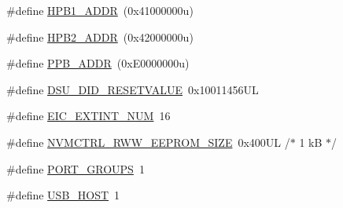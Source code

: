 \begin{DoxyCompactItemize}
\#define \mbox{\hyperlink{group___s_a_m_d21_e15_b_u__definitions_gabdae009c8fef488e4248183ffa937535}{H\+P\+B1\+\_\+\+A\+D\+DR}}~(0x41000000u)
\item 
\#define \mbox{\hyperlink{group___s_a_m_d21_e15_b_u__definitions_gaef42fa53ddf169a2a50be70d29f73571}{H\+P\+B2\+\_\+\+A\+D\+DR}}~(0x42000000u)
\item 
\#define \mbox{\hyperlink{group___s_a_m_d21_e15_b_u__definitions_ga8895d0a3a9a3126cc44330f86c8ce564}{P\+P\+B\+\_\+\+A\+D\+DR}}~(0x\+E0000000u)
\item 
\#define \mbox{\hyperlink{group___s_a_m_d21_e15_b_u__definitions_gada75131d542c9e1966238f5488f89bd6}{D\+S\+U\+\_\+\+D\+I\+D\+\_\+\+R\+E\+S\+E\+T\+V\+A\+L\+UE}}~0x10011456\+UL
\item 
\#define \mbox{\hyperlink{group___s_a_m_d21_e15_b_u__definitions_ga88ebc38c95506296f5d21f82476296ae}{E\+I\+C\+\_\+\+E\+X\+T\+I\+N\+T\+\_\+\+N\+UM}}~16
\item 
\#define \mbox{\hyperlink{group___s_a_m_d21_e15_b_u__definitions_gacb7a115808eeb0b50bd55888f9ba65ae}{N\+V\+M\+C\+T\+R\+L\+\_\+\+R\+W\+W\+\_\+\+E\+E\+P\+R\+O\+M\+\_\+\+S\+I\+ZE}}~0x400\+U\+L /$\ast$ 1 k\+B $\ast$/
\item 
\#define \mbox{\hyperlink{group___s_a_m_d21_e15_b_u__definitions_gab9243ffe03a1dc631b57a495b4b3d467}{P\+O\+R\+T\+\_\+\+G\+R\+O\+U\+PS}}~1
\item 
\#define \mbox{\hyperlink{group___s_a_m_d21_e15_b_u__definitions_ga856aa08fb33114928cbc8635be1792e4}{U\+S\+B\+\_\+\+H\+O\+ST}}~1
\end{DoxyCompactItemize}
